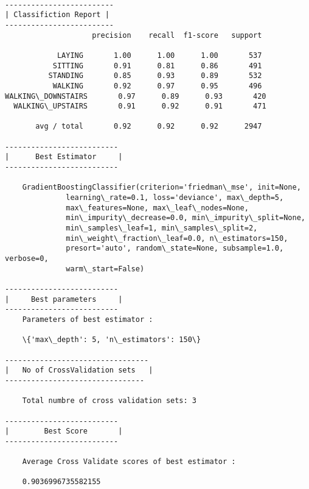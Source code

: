 \documentclass[11pt]{article}
\begin{document}
    \begin{center}
    \end{center}
    { \hspace*{\fill} \\}
    
    \begin{Verbatim}[commandchars=\\\{\}]
-------------------------
| Classifiction Report |
-------------------------
                    precision    recall  f1-score   support

            LAYING       1.00      1.00      1.00       537
           SITTING       0.91      0.81      0.86       491
          STANDING       0.85      0.93      0.89       532
           WALKING       0.92      0.97      0.95       496
WALKING\_DOWNSTAIRS       0.97      0.89      0.93       420
  WALKING\_UPSTAIRS       0.91      0.92      0.91       471

       avg / total       0.92      0.92      0.92      2947

--------------------------
|      Best Estimator     |
--------------------------

	GradientBoostingClassifier(criterion='friedman\_mse', init=None,
              learning\_rate=0.1, loss='deviance', max\_depth=5,
              max\_features=None, max\_leaf\_nodes=None,
              min\_impurity\_decrease=0.0, min\_impurity\_split=None,
              min\_samples\_leaf=1, min\_samples\_split=2,
              min\_weight\_fraction\_leaf=0.0, n\_estimators=150,
              presort='auto', random\_state=None, subsample=1.0, verbose=0,
              warm\_start=False)

--------------------------
|     Best parameters     |
--------------------------
	Parameters of best estimator : 

	\{'max\_depth': 5, 'n\_estimators': 150\}

---------------------------------
|   No of CrossValidation sets   |
--------------------------------

	Total numbre of cross validation sets: 3

--------------------------
|        Best Score       |
--------------------------

	Average Cross Validate scores of best estimator : 

	0.9036996735582155


    \end{Verbatim}
\end{document}
